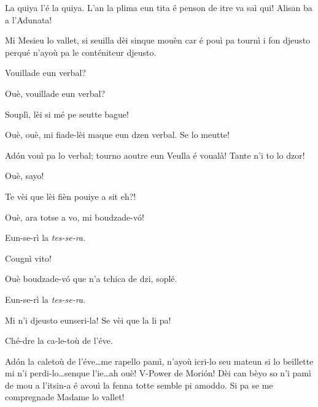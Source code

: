 \begin{drama}

\Prosperospeaks{} La quiya l'é la quiya. L'an la plima eun tita é penson de itre va saì qui! Alisan ba a l'Adunata!

\Pierluigispeaks Mi Mesieu lo vallet, si seuilla dèi sinque mouèn car é pouì pa tournì i fon djeusto perqué n'ayoù pa le conténiteur djeusto.

\Valletspeaks Vouillade eun verbal?

\Prosperospeaks Ouè, vouillade eun verbal?

\Valletspeaks {} Souplì, lèi si mé pe seutte bague!

\Prosperospeaks Ouè, ouè, mi fiade-lèi maque eun dzen verbal. Se lo meutte!

\Pierluigispeaks{} Ad\'on vouì pa lo verbal;  tourno aoutre eun Veulla é voualà! Tante n'i to lo dzor! 

\Valletspeaks Ouè, sayo!


\Prosperospeaks{} Te vèi que lèi fièn pouiye a sit eh?!

\Valletspeaks Ouè, ara totse a vo, mi boudzade-v\'o! 

\Machinaspeaks Eun-se-rì la \textit{tes-se-ra}.

\Prosperospeaks{} Cougnì vito!

\Valletspeaks Ouè boudzade-v\'o que n'a tchica de dzi, soplé.


\Machinaspeaks Eun-se-rì la \textit{tes-se-ra}.

\Prosperospeaks Mi n'i djeusto eunseri-la! Se vèi que la li pa!


\Machinaspeaks Ché-dre la ca-le-toù de l'éve.

\Prosperospeaks{} Ad\'on la caletoù de l'éve\ldots me rapello pamì, n'ayoù icri-lo seu mateun si lo beillette mi n'i perdi-lo\ldots senque l'ie\ldots ah ouè!  V-Power de Mori\'on! Dèi can bèyo so n'i pamì de mou a l'itsin-a é avouì la fenna totte semble pi amoddo. Si pa se me compregnade Madame lo vallet\ok !


\end{drama}

